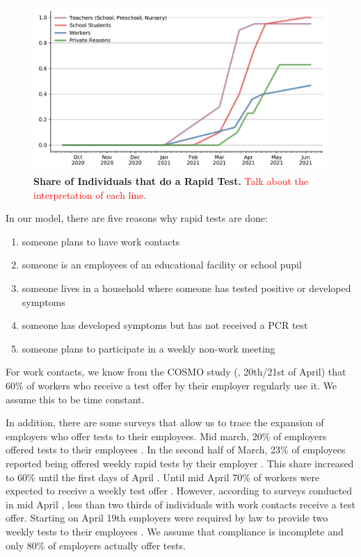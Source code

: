 \begin{figure}
\centering
\includegraphics{../figures/results/figures/data/testing/rapid_test_demand_shares}
\caption{\textbf{Share of Individuals that do a Rapid Test.} \textcolor{red}{Talk about the interpretation of each line.}}
\end{figure}

In our model, there are five reasons why rapid tests are done:
\begin{enumerate}
    \item someone plans to have work contacts
    \item someone is an employees of an educational facility or school pupil
    \item someone lives in a household where someone has tested positive or developed symptoms
    \item someone has developed symptoms but has not received a PCR test
    \item someone plans to participate in a weekly non-work meeting
\end{enumerate}


For work contacts, we know from the COSMO study (\cite{Betsch2021}, 20th/21st of April) that 60\% of workers who receive a test offer by their employer regularly use it. We assume this to be time constant.

In addition, there are some surveys that allow us to trace the expansion of employers who
offer tests to their employees. Mid march, 20\% of employers offered tests to their
employees \citep{DIHK2021}. In the second half of March, 23\% of employees reported being
offered weekly rapid tests by their employer \citep{Ahlers2021}. This share increased to
60\% until the first days of April \cite{ZDF2021}. Until mid April 70\% of workers were
expected to receive a weekly test offer \citep{AerzteZeitung2021}. However, according to
surveys conducted in mid April \citep{Betsch2021}, less than two thirds of individuals
with work contacts receive a test offer. Starting on April 19th employers were required by law to provide two weekly tests to their employees \citep{Bundesanzeiger2021}.
We assume that compliance is incomplete and only 80\% of employers actually offer tests.

